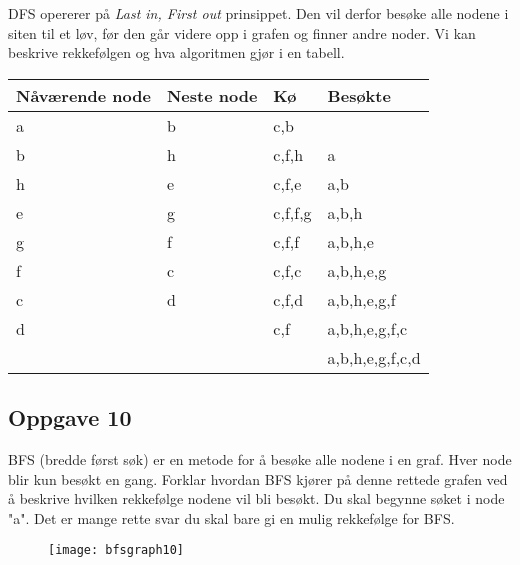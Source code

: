 \documentclass{article}
\begin{document}
    \begin{ans}
        DFS opererer på \textit{Last in, First out} prinsippet. Den vil derfor besøke alle nodene i siten til et løv, før den går videre opp i grafen og finner andre noder. Vi kan beskrive rekkefølgen og hva algoritmen gjør i en tabell.

        \begin{table}[H]
            \begin{center}
                \begin{tabular}[c]{|l|l|l|l|}
                    \hline
                    Nåværende node& Neste node & Kø & Besøkte  \\
                    \hline
                      a&b&c,b& \\
                    \hline
                      b&h&c,f,h&a \\
                    \hline
                      h&e&c,f,e&a,b \\
                    \hline
                      e&g&c,f,f,g&a,b,h \\
                    \hline
                      g&f&c,f,f&a,b,h,e \\
                    \hline
                      f&c&c,f,c&a,b,h,e,g \\
                    \hline
                      c&d&c,f,d&a,b,h,e,g,f \\
                    \hline
                      d&&c,f&a,b,h,e,g,f,c \\
                    \hline
                      &&&a,b,h,e,g,f,c,d \\
                    \hline
                \end{tabular}
            \end{center}
        \end{table}
    \end{ans}

\subsection{Oppgave 10}
BFS (bredde først søk) er en metode for å besøke alle nodene i en graf. Hver node blir kun besøkt en gang. Forklar hvordan BFS kjører på denne rettede grafen ved å beskrive hvilken rekkefølge nodene vil bli besøkt. Du skal begynne søket i node "a". Det er mange rette svar du skal bare gi en mulig rekkefølge for BFS.



\begin{figure}[H]
    \begin{center}
        \texttt{[image: bfsgraph10]}
    \end{center}
\end{figure}
\end{document}
